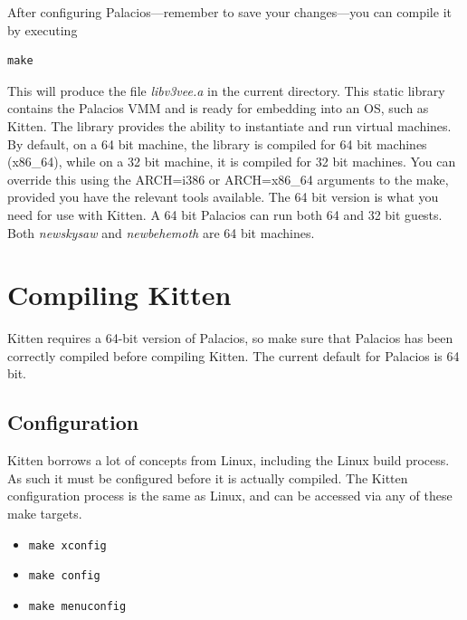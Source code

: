 \documentclass[11pt]{article}
\begin{document}
After configuring Palacios---remember to save your changes---you can
compile it by executing
\begin{verbatim}
make 
\end{verbatim}
This will produce the file {\em libv3vee.a} in the current directory.
This static library contains the Palacios VMM and is ready for
embedding into an OS, such as Kitten.  The library provides the
ability to instantiate and run virtual machines.  By default, on a 64
bit machine, the library is compiled for 64 bit machines (x86\_64),
while on a 32 bit machine, it is compiled for 32 bit machines.  You
can override this using the ARCH=i386 or ARCH=x86\_64 arguments to the
make, provided you have the relevant tools available.  The 64 bit
version is what you need for use with Kitten.  A 64 bit Palacios can
run both 64 and 32 bit guests.  Both {\em newskysaw} and {\em
newbehemoth} are 64 bit machines. 


\section{Compiling Kitten}
Kitten requires a 64-bit version of Palacios, so make sure that
Palacios has been correctly compiled before compiling Kitten.  The
current default for Palacios is 64 bit. 

\subsection{Configuration}
Kitten borrows a lot of concepts from Linux, including the Linux build
process. As such it must be configured before it is actually compiled.
The Kitten configuration process is the same as Linux, and can be
accessed via any of these make targets.
\begin{itemize}
\item \verb.make xconfig.
\item \verb.make config.
\item \verb.make menuconfig.
\end{itemize}
\end{document}
